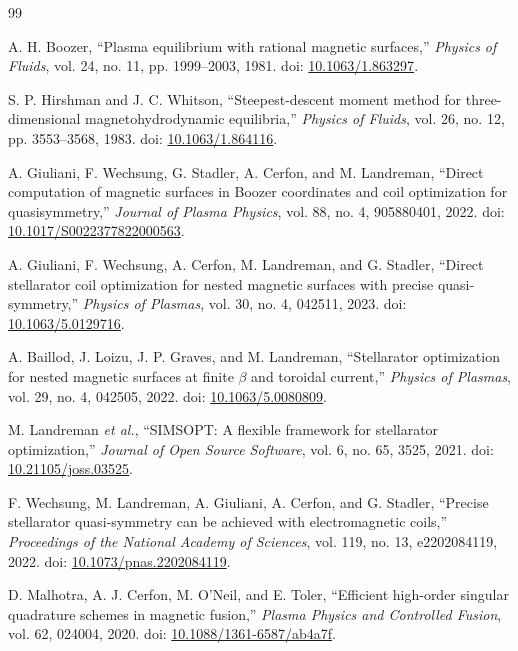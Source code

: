 \documentclass[11pt]{article}
\begin{document}
\begin{thebibliography}{99}

A. H. Boozer, ``Plasma equilibrium with rational magnetic surfaces,'' \emph{Physics of Fluids}, vol. 24, no. 11, pp. 1999--2003, 1981. doi: \href{https://doi.org/10.1063/1.863297}{10.1063/1.863297}.

S. P. Hirshman and J. C. Whitson, ``Steepest-descent moment method for three-dimensional magnetohydrodynamic equilibria,'' \emph{Physics of Fluids}, vol. 26, no. 12, pp. 3553--3568, 1983. doi: \href{https://doi.org/10.1063/1.864116}{10.1063/1.864116}.

A. Giuliani, F. Wechsung, G. Stadler, A. Cerfon, and M. Landreman, ``Direct computation of magnetic surfaces in Boozer coordinates and coil optimization for quasisymmetry,'' \emph{Journal of Plasma Physics}, vol. 88, no. 4, 905880401, 2022. doi: \href{https://doi.org/10.1017/S0022377822000563}{10.1017/S0022377822000563}.

A. Giuliani, F. Wechsung, A. Cerfon, M. Landreman, and G. Stadler, ``Direct stellarator coil optimization for nested magnetic surfaces with precise quasi-symmetry,'' \emph{Physics of Plasmas}, vol. 30, no. 4, 042511, 2023. doi: \href{https://doi.org/10.1063/5.0129716}{10.1063/5.0129716}.

A. Baillod, J. Loizu, J. P. Graves, and M. Landreman, ``Stellarator optimization for nested magnetic surfaces at finite $\beta$ and toroidal current,'' \emph{Physics of Plasmas}, vol. 29, no. 4, 042505, 2022. doi: \href{https://doi.org/10.1063/5.0080809}{10.1063/5.0080809}.

M. Landreman \emph{et al.}, ``SIMSOPT: A flexible framework for stellarator optimization,'' \emph{Journal of Open Source Software}, vol. 6, no. 65, 3525, 2021. doi: \href{https://doi.org/10.21105/joss.03525}{10.21105/joss.03525}.

F. Wechsung, M. Landreman, A. Giuliani, A. Cerfon, and G. Stadler, ``Precise stellarator quasi-symmetry can be achieved with electromagnetic coils,'' \emph{Proceedings of the National Academy of Sciences}, vol. 119, no. 13, e2202084119, 2022. doi: \href{https://doi.org/10.1073/pnas.2202084119}{10.1073/pnas.2202084119}.

D. Malhotra, A. J. Cerfon, M. O'Neil, and E. Toler, ``Efficient high-order singular quadrature schemes in magnetic fusion,'' \emph{Plasma Physics and Controlled Fusion}, vol. 62, 024004, 2020. doi: \href{https://doi.org/10.1088/1361-6587/ab4a7f}{10.1088/1361-6587/ab4a7f}.

\end{thebibliography}
\end{document}
